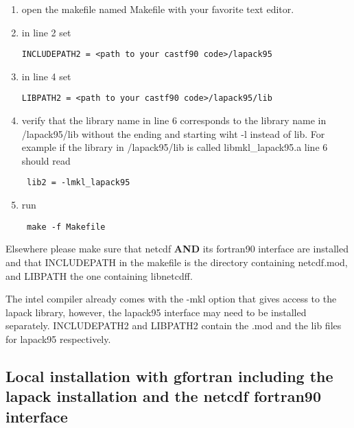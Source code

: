 \documentclass[11p,a4paper]{article}
\begin{document}
\begin{enumerate}
\item open the makefile named Makefile with your favorite text editor.
\item in line 2 set 
\begin{verbatim}
INCLUDEPATH2 = <path to your castf90 code>/lapack95
\end{verbatim}
\item in line 4 set
\begin{verbatim}
LIBPATH2 = <path to your castf90 code>/lapack95/lib
\end{verbatim}
\item verify that the library name in line 6 corresponds to the library name in /lapack95/lib without the ending and starting wiht -l instead of lib. For example if the library in /lapack95/lib is called libmkl\_lapack95.a line 6 should read 
\begin{verbatim}
 lib2 = -lmkl_lapack95 
\end{verbatim}
\item run
\begin{verbatim}
 make -f Makefile
\end{verbatim}
\end{enumerate}

Elsewhere please make sure that netcdf \textbf{AND} its fortran90 interface are installed and that INCLUDEPATH in the makefile is the directory containing netcdf.mod, and LIBPATH the one containing libnetcdff. 

The intel compiler already comes with the -mkl option that gives access to the lapack library, however, the lapack95 interface may need to be installed separately. INCLUDEPATH2 and LIBPATH2 contain the .mod and the lib files for lapack95 respectively. 


\subsection{Local installation with gfortran including the lapack installation and the netcdf fortran90 interface}
\end{document}
